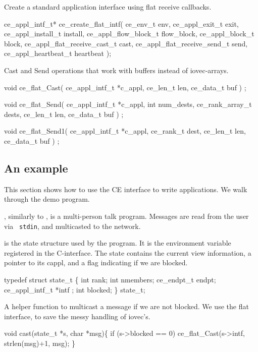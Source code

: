 Create a standard application interface using flat receive callbacks.
\begin{codebox}
ce_appl_intf_t*
ce_create_flat_intf(
    ce_env_t env, 
    ce_appl_exit_t exit,
    ce_appl_install_t install,
    ce_appl_flow_block_t flow_block,
    ce_appl_block_t block,
    ce_appl_flat_receive_cast_t cast,
    ce_appl_flat_receive_send_t send,
    ce_appl_heartbeat_t heartbeat
);
\end{codebox}


Cast and Send operations that work with buffers instead of iovec-arrays.
\begin{codebox}
void ce_flat_Cast(
    ce_appl_intf_t *c_appl,
    ce_len_t len, 
    ce_data_t buf
) ;

void ce_flat_Send(
    ce_appl_intf_t *c_appl,
    int num_dests,
    ce_rank_array_t dests,
    ce_len_t len, 
    ce_data_t buf
) ;

void ce_flat_Send1(
    ce_appl_intf_t *c_appl,
    ce_rank_t dest,
    ce_len_t len, 
    ce_data_t buf
) ;
\end{codebox}



\subsection{An example}

This section shows how to use the CE interface to write applications. 
We walk through the  demo program.

, similarly to ,
is a multi-person talk program. Messages are read from the user via {\tt
stdin}, and multicasted to the network.

 is the state structure used by the program. It is the
environment variable registered in the C-interface. The state contains
the current view information, a pointer to its cappl, and a flag
indicating if we are blocked.
\begin{codebox}
typedef struct state_t \{
    int rank;
    int nmembers;
    ce_endpt_t endpt;
    ce_appl_intf_t *intf ;
    int blocked;
\} state_t;
\end{codebox}


A helper function to multicast a message if we are not blocked. 
We use the flat interface, to save the messy handling of iovec's.
\begin{codebox}
void cast(state_t *s, char *msg)\{
  if (s->blocked == 0)
    ce_flat_Cast(s->intf, strlen(msg)+1, msg);
\}
\end{codebox}
 

